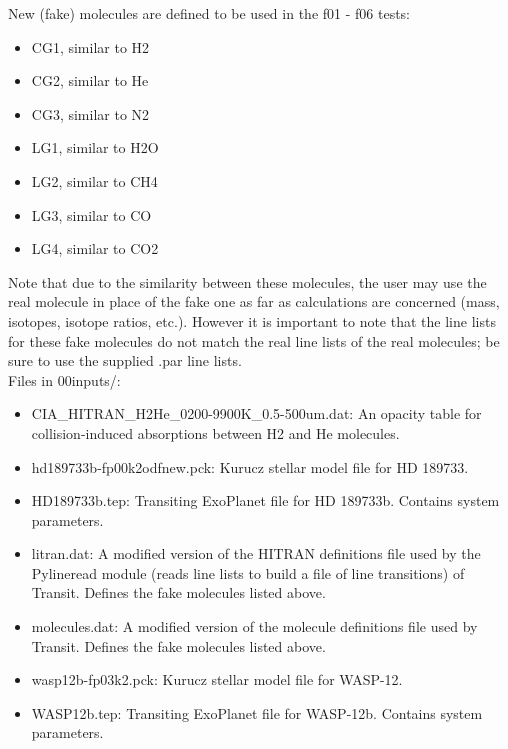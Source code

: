\documentclass[letterpaper, 12pt]{article}
\begin{document}
New (fake) molecules are defined to be used in the f01 - f06 tests:
\begin{itemize} \itemsep0pt
  \item CG1, similar to H2
  \item CG2, similar to He
  \item CG3, similar to N2
  \item LG1, similar to H2O
  \item LG2, similar to CH4
  \item LG3, similar to CO
  \item LG4, similar to CO2
\end{itemize}
Note that due to the similarity between these molecules, the user may use 
the real molecule in place of the fake one as far as calculations are 
concerned (mass, isotopes, isotope ratios, etc.). However it is important to 
note that the line lists for these fake molecules do not match the real line 
lists of the real molecules; be sure to use the supplied .par line lists.\\

Files in 00inputs/:
\begin{itemize} \itemsep0pt
  \item CIA{\_}HITRAN{\_}H2He{\_}0200-9900K{\_}0.5-500um.dat: An opacity table 
        for collision-induced absorptions between H2 and He molecules.
  \item hd189733b-fp00k2odfnew.pck: Kurucz stellar model file for HD 189733.
  \item HD189733b.tep: Transiting ExoPlanet file for HD 189733b. Contains 
        system parameters.
  \item litran.dat: A modified version of the HITRAN definitions file used by 
        the Pylineread module (reads line lists to build a file of line 
        transitions) of Transit. Defines the fake molecules listed above.
  \item molecules.dat: A modified version of the molecule definitions file 
        used by Transit. Defines the fake molecules listed above.
  \item wasp12b-fp03k2.pck: Kurucz stellar model file for WASP-12.
  \item WASP12b.tep: Transiting ExoPlanet file for WASP-12b. Contains system 
        parameters.
\end{itemize}
\end{document}

